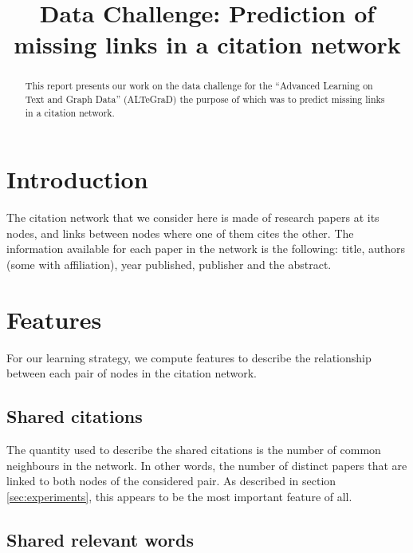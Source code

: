 \documentclass{article}
\title{Data Challenge: Prediction of missing links in a citation network}
\begin{document}
\ninept

\maketitle

\begin{abstract}
This report presents our work on the data challenge for the \enquote{Advanced Learning on Text and Graph Data} (ALTeGraD) the purpose of which was to predict missing links in a citation network.
\end{abstract}


\section{Introduction}

The citation network that we consider here is made of research papers at its nodes, and links between nodes where one of them cites the other.
The information available for each paper in the network is the following: title, authors (some with affiliation), year published, publisher and the abstract.

\section{Features}

For our learning strategy, we compute features to describe the relationship between each pair of nodes in the citation network.

\subsection{Shared citations}

The quantity used to describe the shared citations is the number of common neighbours in the network. In other words, the number of distinct papers that are linked to both nodes of the considered pair.
As described in section \ref{sec:experiments}, this appears to be the most important feature of all.

\subsection{Shared relevant words}
\end{document}
